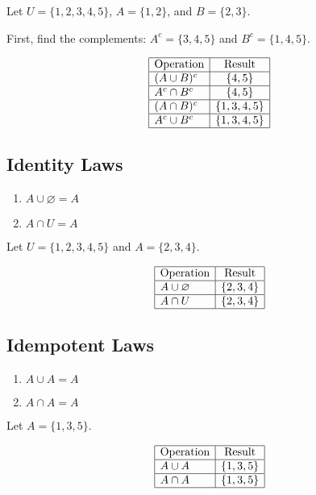 \documentclass[12pt,a4paper,openany]{article}
\begin{document}
Let $U = \{1, 2, 3, 4, 5\}$, $A = \{1, 2\}$, and $B = \{2, 3\}$.

First, find the complements:  
$A^c = \{3, 4, 5\}$ and $B^c = \{1, 4, 5\}$.

\[
\begin{array}{|l|c|}
\hline
\text{Operation} & \text{Result} \\ \hline
(A \cup B)^c & \{4, 5\} \\ \hline
A^c \cap B^c & \{4, 5\} \\ \hline
(A \cap B)^c & \{1, 3, 4, 5\} \\ \hline
A^c \cup B^c & \{1, 3, 4, 5\} \\ \hline
\end{array}
\]


\subsection{Identity Laws}

\begin{enumerate}
    \item $A \cup \varnothing = A$
    \item $A \cap U = A$
\end{enumerate}

Let $U = \{1, 2, 3, 4, 5\}$ and $A = \{2, 3, 4\}$.

\[
\begin{array}{|l|c|}
\hline
\text{Operation} & \text{Result} \\ \hline
A \cup \varnothing & \{2, 3, 4\} \\ \hline
A \cap U & \{2, 3, 4\} \\ \hline
\end{array}
\]


\subsection{Idempotent Laws}

\begin{enumerate}
    \item $A \cup A = A$
    \item $A \cap A = A$
\end{enumerate}

Let $A = \{1, 3, 5\}$.

\[
\begin{array}{|l|c|}
\hline
\text{Operation} & \text{Result} \\ \hline
A \cup A & \{1, 3, 5\} \\ \hline
A \cap A & \{1, 3, 5\} \\ \hline
\end{array}
\]
\end{document}
